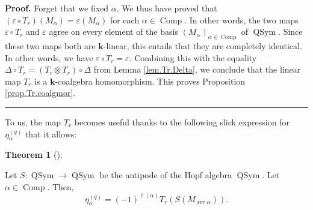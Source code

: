 \documentclass[numbers=enddot,12pt,final,onecolumn,notitlepage]{scrartcl}%
\theoremstyle{definition}
\newtheorem{theo}{Theorem}[section]
\newenvironment{theorem}[1][]
{\begin{theo}[#1]\begin{leftbar}}
{\end{leftbar}\end{theo}}
\newenvironment{proof}[1][Proof]{\noindent\textbf{#1.} }{\ \rule{0.5em}{0.5em}}
\newenvironment{verlong}{}{}
\begin{document}
\begin{verlong}
\begin{proof}
Forget that we fixed $\alpha$. We thus have proved that $\left(
\varepsilon\circ T_{r}\right)  \left(  M_{\alpha}\right)  =\varepsilon\left(
M_{\alpha}\right)  $ for each $\alpha\in\operatorname*{Comp}$. In other words,
the two maps $\varepsilon\circ T_{r}$ and $\varepsilon$ agree on every element
of the basis $\left(  M_{\alpha}\right)  _{\alpha\in\operatorname*{Comp}}$ of
$\operatorname*{QSym}$. Since these two maps both are $\mathbf{k}$-linear,
this entails that they are completely identical. In other words, we have
$\varepsilon\circ T_{r}=\varepsilon$. Combining this with the equality
$\Delta\circ T_{r}=\left(  T_{r}\otimes T_{r}\right)  \circ\Delta$ from Lemma
\ref{lem.Tr.Delta}, we conclude that the linear map $T_{r}$ is a $\mathbf{k}%
$-coalgebra homomorphism. This proves Proposition \ref{prop.Tr.coalgmor}.
\end{proof}
\end{verlong}

To us, the map $T_{r}$ becomes useful thanks to the following slick expression
for $\eta_{\alpha}^{\left(  q\right)  }$ that it allows:

\begin{theorem}
\label{thm.Tr.eta}Let $S:\operatorname*{QSym}\rightarrow\operatorname*{QSym}$
be the antipode of the Hopf algebra $\operatorname*{QSym}$. Let $\alpha
\in\operatorname*{Comp}$. Then,%
\[
\eta_{\alpha}^{\left(  q\right)  }=\left(  -1\right)  ^{\ell\left(
\alpha\right)  }T_{r}\left(  S\left(  M_{\operatorname*{rev}\alpha}\right)
\right)  .
\]

\end{theorem}
\end{document}
